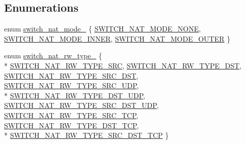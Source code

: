 \subsection*{Enumerations}
\begin{DoxyCompactItemize}
\item 
enum \hyperlink{group__NAT_ga7c0d74966364e5e894e105a20149dfd3}{switch\+\_\+nat\+\_\+mode\+\_\+} \{ \hyperlink{group__NAT_gga7c0d74966364e5e894e105a20149dfd3affb0434de280f7c9ab1555aa011eed54}{S\+W\+I\+T\+C\+H\+\_\+\+N\+A\+T\+\_\+\+M\+O\+D\+E\+\_\+\+N\+O\+N\+E}, 
\hyperlink{group__NAT_gga7c0d74966364e5e894e105a20149dfd3a926c0164504c70f20b6014c6c1f7c4ae}{S\+W\+I\+T\+C\+H\+\_\+\+N\+A\+T\+\_\+\+M\+O\+D\+E\+\_\+\+I\+N\+N\+E\+R}, 
\hyperlink{group__NAT_gga7c0d74966364e5e894e105a20149dfd3a8a64798279881e3eb48c1278179933be}{S\+W\+I\+T\+C\+H\+\_\+\+N\+A\+T\+\_\+\+M\+O\+D\+E\+\_\+\+O\+U\+T\+E\+R}
 \}
\item 
enum \hyperlink{group__NAT_ga6b4b3f0aa8ed5ce0e4561e64ea9d45ed}{switch\+\_\+nat\+\_\+rw\+\_\+type\+\_\+} \{ \\*
\hyperlink{group__NAT_gga6b4b3f0aa8ed5ce0e4561e64ea9d45eda9150917a141262ea57622560fac022c9}{S\+W\+I\+T\+C\+H\+\_\+\+N\+A\+T\+\_\+\+R\+W\+\_\+\+T\+Y\+P\+E\+\_\+\+S\+R\+C}, 
\hyperlink{group__NAT_gga6b4b3f0aa8ed5ce0e4561e64ea9d45edaa33fe3514dac6f8f602b06e7c95f73d1}{S\+W\+I\+T\+C\+H\+\_\+\+N\+A\+T\+\_\+\+R\+W\+\_\+\+T\+Y\+P\+E\+\_\+\+D\+S\+T}, 
\hyperlink{group__NAT_gga6b4b3f0aa8ed5ce0e4561e64ea9d45edafec88669b2c91368b47b3843c8c98f21}{S\+W\+I\+T\+C\+H\+\_\+\+N\+A\+T\+\_\+\+R\+W\+\_\+\+T\+Y\+P\+E\+\_\+\+S\+R\+C\+\_\+\+D\+S\+T}, 
\hyperlink{group__NAT_gga6b4b3f0aa8ed5ce0e4561e64ea9d45eda42f2f0f3cad317ccf9d8fe1c29bc8f0a}{S\+W\+I\+T\+C\+H\+\_\+\+N\+A\+T\+\_\+\+R\+W\+\_\+\+T\+Y\+P\+E\+\_\+\+S\+R\+C\+\_\+\+U\+D\+P}, 
\\*
\hyperlink{group__NAT_gga6b4b3f0aa8ed5ce0e4561e64ea9d45eda18855b1a4373513f4df20c95deeac556}{S\+W\+I\+T\+C\+H\+\_\+\+N\+A\+T\+\_\+\+R\+W\+\_\+\+T\+Y\+P\+E\+\_\+\+D\+S\+T\+\_\+\+U\+D\+P}, 
\hyperlink{group__NAT_gga6b4b3f0aa8ed5ce0e4561e64ea9d45edabd566948a892f5c7721c68b64d763f67}{S\+W\+I\+T\+C\+H\+\_\+\+N\+A\+T\+\_\+\+R\+W\+\_\+\+T\+Y\+P\+E\+\_\+\+S\+R\+C\+\_\+\+D\+S\+T\+\_\+\+U\+D\+P}, 
\hyperlink{group__NAT_gga6b4b3f0aa8ed5ce0e4561e64ea9d45eda474778174b227d7c9e27d916a87b0bd0}{S\+W\+I\+T\+C\+H\+\_\+\+N\+A\+T\+\_\+\+R\+W\+\_\+\+T\+Y\+P\+E\+\_\+\+S\+R\+C\+\_\+\+T\+C\+P}, 
\hyperlink{group__NAT_gga6b4b3f0aa8ed5ce0e4561e64ea9d45eda13de1fd730c3d578cf1545a42704bffd}{S\+W\+I\+T\+C\+H\+\_\+\+N\+A\+T\+\_\+\+R\+W\+\_\+\+T\+Y\+P\+E\+\_\+\+D\+S\+T\+\_\+\+T\+C\+P}, 
\\*
\hyperlink{group__NAT_gga6b4b3f0aa8ed5ce0e4561e64ea9d45edac779dc92a9a2f50f703007a1b2a6a06d}{S\+W\+I\+T\+C\+H\+\_\+\+N\+A\+T\+\_\+\+R\+W\+\_\+\+T\+Y\+P\+E\+\_\+\+S\+R\+C\+\_\+\+D\+S\+T\+\_\+\+T\+C\+P}
 \}
\end{DoxyCompactItemize}
